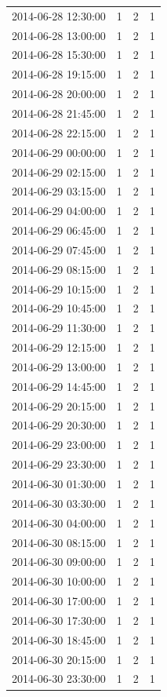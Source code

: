\begin{tabular}{lrrr}
2014-06-28 12:30:00 & 1 & 2 & 1 \\
2014-06-28 13:00:00 & 1 & 2 & 1 \\
2014-06-28 15:30:00 & 1 & 2 & 1 \\
2014-06-28 19:15:00 & 1 & 2 & 1 \\
2014-06-28 20:00:00 & 1 & 2 & 1 \\
2014-06-28 21:45:00 & 1 & 2 & 1 \\
2014-06-28 22:15:00 & 1 & 2 & 1 \\
2014-06-29 00:00:00 & 1 & 2 & 1 \\
2014-06-29 02:15:00 & 1 & 2 & 1 \\
2014-06-29 03:15:00 & 1 & 2 & 1 \\
2014-06-29 04:00:00 & 1 & 2 & 1 \\
2014-06-29 06:45:00 & 1 & 2 & 1 \\
2014-06-29 07:45:00 & 1 & 2 & 1 \\
2014-06-29 08:15:00 & 1 & 2 & 1 \\
2014-06-29 10:15:00 & 1 & 2 & 1 \\
2014-06-29 10:45:00 & 1 & 2 & 1 \\
2014-06-29 11:30:00 & 1 & 2 & 1 \\
2014-06-29 12:15:00 & 1 & 2 & 1 \\
2014-06-29 13:00:00 & 1 & 2 & 1 \\
2014-06-29 14:45:00 & 1 & 2 & 1 \\
2014-06-29 20:15:00 & 1 & 2 & 1 \\
2014-06-29 20:30:00 & 1 & 2 & 1 \\
2014-06-29 23:00:00 & 1 & 2 & 1 \\
2014-06-29 23:30:00 & 1 & 2 & 1 \\
2014-06-30 01:30:00 & 1 & 2 & 1 \\
2014-06-30 03:30:00 & 1 & 2 & 1 \\
2014-06-30 04:00:00 & 1 & 2 & 1 \\
2014-06-30 08:15:00 & 1 & 2 & 1 \\
2014-06-30 09:00:00 & 1 & 2 & 1 \\
2014-06-30 10:00:00 & 1 & 2 & 1 \\
2014-06-30 17:00:00 & 1 & 2 & 1 \\
2014-06-30 17:30:00 & 1 & 2 & 1 \\
2014-06-30 18:45:00 & 1 & 2 & 1 \\
2014-06-30 20:15:00 & 1 & 2 & 1 \\
2014-06-30 23:30:00 & 1 & 2 & 1 \\

\end{tabular}
